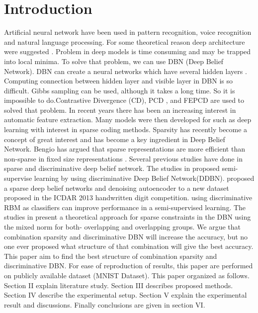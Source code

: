 \documentclass[conference]{IEEEtran}
\begin{document}
\section{Introduction}
Artificial neural network have been used in pattern
recognition, voice recognition and natural language
processing. For some theoretical reason deep architecture were
suggested \cite{keyvanrad1}.
Problem in deep models is time consuming and may be
trapped into local minima. To solve that problem, we can use
DBN (Deep Belief Network). DBN can create a neural
networks which have several hidden layers \cite{liu1}.
Computing connection between hidden layer and visible
layer in DBN is so difficult. Gibbs sampling can be used,
although it takes a long time. So it is impossible to
do.Contrastive Divergence (CD)\cite{carreiraperpinan1}, PCD \cite{tieleman1}, and FEPCD \cite{keyvanrad2}
are used to solved that problem.
In recent years there has been an increasing interest in
automatic feature extraction. Many models were then
developed for such as deep learning with interest in sparse
coding\cite{olshausen1}  methods.
Sparsity has recently become a concept of great interest
and has become a key ingredient in Deep Belief Network.
Bengio has argued that sparse representations are more
efficient than non-sparse in fixed size representations \cite{bengio1}.
Several previous studies have done in sparse and
discriminative deep belief network. The studies in\cite{tieleman1}
proposed semi-supervise learning by using discriminative
Deep Belief Network(DDBN). \cite{walid1} proposed a sparse deep
belief networks and denoising autoencoder to a new dataset
proposed in the ICDAR 2013 handwritten digit
competition.\cite{larochelle1} using discriminative RBM as classifiers can
improve performance in a semi-supervised learning. The
studies in\cite{halkias1} present a theoretical approach for sparse
constraints in the DBN using the mixed norm for both-
overlapping and overlapping groups.
We argue that combination sparsity and discriminative
DBN will increase the accuracy, but no one ever proposed
what structure of that combination will give the best accuracy.
This paper aim to find the best structure of combination
sparsity and discriminative DBN. For ease of reproduction of
results, this paper are performed on publicly available dataset
(MNIST Dataset). This paper organized as follows. Section II
explain literature study. Section III describes proposed
methods. Section IV describe the experimental setup. Section
V explain the experimental result and discussions. Finally
conclusions are given in section VI.
\end{document}
